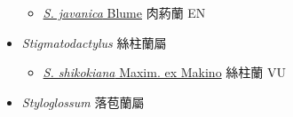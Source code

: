 \begin{itemize}
  \begin{itemize}
        \item[] \href{http://www.theplantlist.org/tpl1.1/search?q=Stereosandra+javanica}{\textit{S. javanica} Blume}   肉葯蘭 EN
  \end{itemize}
 \item[] \textit{Stigmatodactylus} 絲柱蘭屬
                    
  \begin{itemize}
        \item[] \href{http://www.theplantlist.org/tpl1.1/search?q=Stigmatodactylus+shikokiana}{\textit{S. shikokiana} Maxim. ex Makino}   絲柱蘭 VU
  \end{itemize}
 \item[] \textit{Styloglossum} 落苞蘭屬
                    

\end{itemize}
